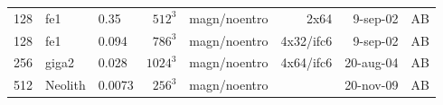 \documentclass[\mydriver,12pt,twoside,notitlepage,a4paper]{article}
\begin{document}
\begin{center}
\begin{small}
\begin{longtable}{rllrlrrr}
 128 & fe1   & 0.35 & $512^3$ & magn/noentro & 2x64   &  9-sep-02 & AB \\
 128 & fe1   & 0.094& $786^3$ & magn/noentro &4x32/ifc6& 9-sep-02 & AB \\
 256 & giga2 & 0.028& $1024^3$& magn/noentro &4x64/ifc6&20-aug-04 & AB \\
 512 &Neolith&0.0073& $256^3$ & magn/noentro &        & 20-nov-09 & AB \\
    \bottomrule
  \end{longtable}
    \end{small}
  \end{center}
\normalsize
\end{document}
